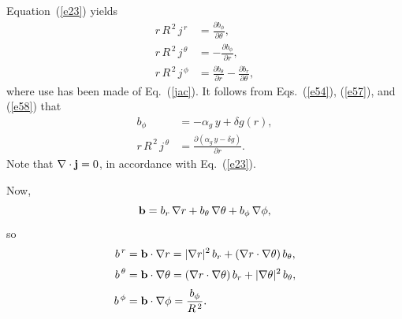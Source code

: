 \documentclass[12pt,prb,aps]{revtex4-1}
\begin{document}
Equation~(\ref{e23}) yields\,\cite{tj}
\begin{align}
r\,R^{\,2}\,j^{\,r} &= \frac{\partial b_\phi}{\partial\theta},\label{e57}\\[0.5ex]
r\,R^{\,2}\,j^{\,\theta} &= -\frac{\partial b_\phi}{\partial r},\label{e58}\\[0.5ex]
r\,R^{\,2}\,j^{\,\phi}&= \frac{\partial b_\theta}{\partial r} -\frac{\partial b_r}{\partial \theta},\label{e59}
\end{align}
where use has been made of Eq.~(\ref{jac}). It follows from Eqs.~(\ref{e54}), (\ref{e57}), and (\ref{e58}) that
\begin{align}\label{e43yy}
b_\phi &=-\alpha_g\,y +\delta g(r),\\[0.5ex]
r\,R^{\,2}\,j^{\,\theta}&=  \frac{\partial (\alpha_g\,y-\delta g)}{\partial r}.\label{e44yy}
\end{align}
Note that $\nabla\cdot{\bf j} = 0$, in accordance with Eq.~(\ref{e23}).

Now, 
\begin{equation}
{\bf b} = b_r\,\nabla r + b_\theta\,\nabla\theta+b_\phi\,\nabla\phi,
\end{equation}
so
\begin{align}
b^{\,r} &= {\bf b}\cdot\nabla r = |\nabla r|^2\,b_r + (\nabla r\cdot\nabla\theta)\,b_\theta,\label{e61}\\[0.5ex]
b^{\,\theta} &= {\bf b}\cdot\nabla \theta = (\nabla r\cdot\nabla\theta)\,b_r + |\nabla\theta|^2\,b_\theta,\label{e62}\\[0.5ex]
b^{\,\phi}&={\bf b}\cdot\nabla\phi =\frac{b_\phi}{R^{\,2}}.\label{e63}
\end{align}
\end{document}
